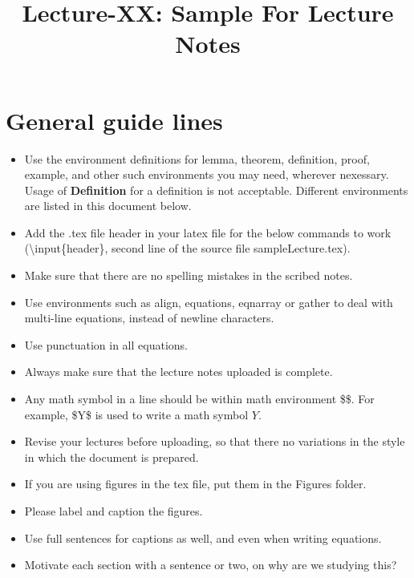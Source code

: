 \documentclass[a4paper,english,10pt]{article}
\title{Lecture-XX: Sample For Lecture Notes}
\author{}
\begin{document}
\maketitle
\section{General guide lines}
\begin{itemize}
\item Use the environment definitions for lemma, theorem, definition, proof, example, and other such environments you may need, wherever nexessary. Usage of {\bf Definition} for a definition is not acceptable. Different environments are listed in this document below.
\item Add the .tex file header in your latex file for the below commands to work (\textbackslash input\{header\}, second line of the source file sampleLecture.tex).
\item Make sure that there are no spelling mistakes in the scribed notes.
\item Use environments such as align, equations, eqnarray or gather to deal with multi-line equations, instead of newline characters. 
\item Use punctuation in all equations.
\item Always make sure that the lecture notes uploaded is complete.
\item Any math symbol in a line should be within math environment \$\$. For example, \$Y\$ is used to write a math symbol $Y$.
\item Revise your lectures before uploading, so that there no variations in the style in which the document is prepared.
\item If you are using figures in the tex file, put them in the Figures folder.
\item Please label and caption the figures.
\item Use full sentences for captions as well, and even when writing equations.
\item Motivate each section with a sentence or two, on why are we studying this?
\end{itemize}
\end{document}
